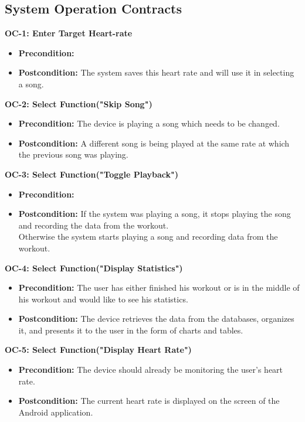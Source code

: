 \documentclass[letterpaper,english, 12pt]{scrreprt}
\begin{document}
\subsection{System Operation Contracts}
{\bf OC-1: Enter Target Heart-rate}
\begin{itemize}
	\item {\bf Precondition: } 
	\item {\bf Postcondition: } The system saves this heart rate and will use it in selecting a song.
\end{itemize}

{\bf OC-2: Select Function("Skip Song")}
\begin{itemize}
	\item {\bf Precondition: } The device is playing a song which needs to be changed.
	\item {\bf Postcondition: } A different song is being played at the same rate at which the previous song was playing.

\end{itemize}

{\bf OC-3: Select Function("Toggle Playback")}
\begin{itemize}
	\item {\bf Precondition: }
	\item {\bf Postcondition: } If the system was playing a song, it stops playing the song and recording the data from the workout.\\
      Otherwise the system starts playing a song and recording data from the workout.

\end{itemize}

{\bf OC-4: Select Function("Display Statistics")}
\begin{itemize}
	\item {\bf Precondition: } The user has either finished his workout or is in the middle of his workout and would like to see his statistics.
	\item {\bf Postcondition: } The device retrieves the data from the databases, organizes it, and presents it to the user in the form of charts and tables.
\end{itemize}

{\bf OC-5: Select Function("Display Heart Rate")}
\begin{itemize}
	\item {\bf Precondition: } The device should already be monitoring the user's heart rate.
	\item {\bf Postcondition: } The current heart rate is displayed on the screen of the Android application.
\end{itemize}
\end{document}
